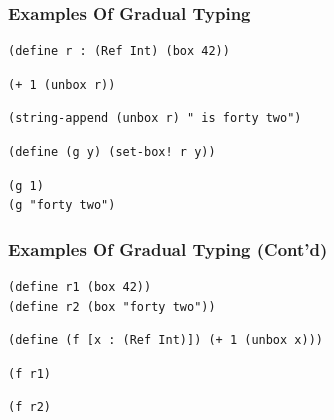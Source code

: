 \documentclass[12pt,dvipsnames]{beamer}
\begin{document}
\begin{frame}[fragile]
\frametitle{Examples Of Gradual Typing}
\begin{center}
  \lstset {
    showstringspaces=false
  }
\begin{lstlisting}
(define r : (Ref Int) (box 42))
\end{lstlisting}
\pause
\begin{lstlisting}
(+ 1 (unbox r))
\end{lstlisting}
\pause
\begin{lstlisting}
(string-append (unbox r) " is forty two")
\end{lstlisting}
\pause
{}
\begin{lstlisting}
(define (g y) (set-box! r y))
\end{lstlisting}
\pause
\begin{lstlisting}
(g 1)
(g "forty two")
\end{lstlisting}
\end{center}

\end{frame}

\begin{frame}[fragile]
\frametitle{Examples Of Gradual Typing (Cont'd)}
\begin{center}
  \lstset {
    showstringspaces=false
  }
\begin{lstlisting}
(define r1 (box 42))
(define r2 (box "forty two"))
\end{lstlisting}
\pause
\begin{lstlisting}
(define (f [x : (Ref Int)]) (+ 1 (unbox x)))
\end{lstlisting}
\pause
\begin{lstlisting}
(f r1)
\end{lstlisting}
\pause
\begin{lstlisting}
(f r2)
\end{lstlisting}
\end{center}

\end{frame}
\end{document}
